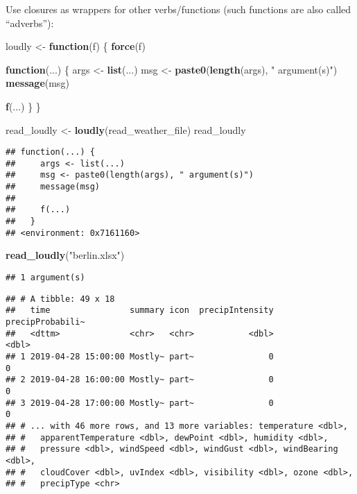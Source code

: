\documentclass[]{book}
\newenvironment{Shaded}{\begin{snugshade}}{\end{snugshade}}
\newcommand{\ControlFlowTok}[1]{\textcolor[rgb]{0.13,0.29,0.53}{\textbf{#1}}}
\newcommand{\KeywordTok}[1]{\textcolor[rgb]{0.13,0.29,0.53}{\textbf{#1}}}
\newcommand{\NormalTok}[1]{#1}
\newcommand{\StringTok}[1]{\textcolor[rgb]{0.31,0.60,0.02}{#1}}
\begin{document}
Use closures as wrappers for other verbs/functions (such functions are also called ``adverbs''):

\begin{Shaded}
\begin{Highlighting}[]
\NormalTok{loudly <-}\StringTok{ }\ControlFlowTok{function}\NormalTok{(f) \{}
  \KeywordTok{force}\NormalTok{(f)}

  \ControlFlowTok{function}\NormalTok{(...) \{}
\NormalTok{    args <-}\StringTok{ }\KeywordTok{list}\NormalTok{(...)}
\NormalTok{    msg <-}\StringTok{ }\KeywordTok{paste0}\NormalTok{(}\KeywordTok{length}\NormalTok{(args), }\StringTok{" argument(s)"}\NormalTok{)}
    \KeywordTok{message}\NormalTok{(msg)}

    \KeywordTok{f}\NormalTok{(...)}
\NormalTok{  \}}
\NormalTok{\}}

\NormalTok{read_loudly <-}\StringTok{ }\KeywordTok{loudly}\NormalTok{(read_weather_file)}
\NormalTok{read_loudly}
\end{Highlighting}
\end{Shaded}

\begin{verbatim}
## function(...) {
##     args <- list(...)
##     msg <- paste0(length(args), " argument(s)")
##     message(msg)
## 
##     f(...)
##   }
## <environment: 0x7161160>
\end{verbatim}

\begin{Shaded}
\begin{Highlighting}[]
\KeywordTok{read_loudly}\NormalTok{(}\StringTok{"berlin.xlsx"}\NormalTok{)}
\end{Highlighting}
\end{Shaded}

\begin{verbatim}
## 1 argument(s)
\end{verbatim}

\begin{verbatim}
## # A tibble: 49 x 18
##   time                summary icon  precipIntensity precipProbabili~
##   <dttm>              <chr>   <chr>           <dbl>            <dbl>
## 1 2019-04-28 15:00:00 Mostly~ part~               0                0
## 2 2019-04-28 16:00:00 Mostly~ part~               0                0
## 3 2019-04-28 17:00:00 Mostly~ part~               0                0
## # ... with 46 more rows, and 13 more variables: temperature <dbl>,
## #   apparentTemperature <dbl>, dewPoint <dbl>, humidity <dbl>,
## #   pressure <dbl>, windSpeed <dbl>, windGust <dbl>, windBearing <dbl>,
## #   cloudCover <dbl>, uvIndex <dbl>, visibility <dbl>, ozone <dbl>,
## #   precipType <chr>
\end{verbatim}
\end{document}
